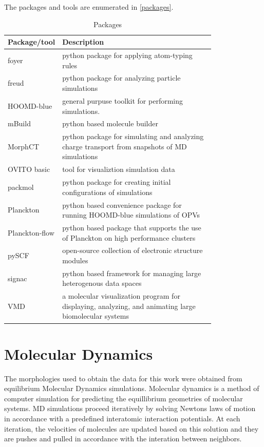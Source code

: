 The packages and tools are enumerated in \autoref{packages}.
\begin{table}[ht]
    \caption{Packages} %
\centering %
\begin{tabular}{|l|p{0.8\linewidth}|} %
\hline\hline %
Package/tool & Description \\ [0.5ex] %
\hline %
    foyer & python package for applying atom-typing rules  \cite{Klein2018a}\\ [1ex] %
freud & python package for analyzing particle simulations  \cite{Ramasubramani2020}\\ [1ex] %
HOOMD-blue & general purpuse toolkit for performing simulations.   \cite{Anderson2020a}\\ [1ex] %
    mBuild & python based molecule builder \cite{Klein2018a}\\ [1ex] %
MorphCT & python package for simulating and analyzing charge transport from 
    snapshots of MD simulations \cite{jones2017}\cite{cmelab}\\[1ex] 
OVITO basic & tool for visualiztion simulation data \cite{Stukowski2010a}\\[1ex] 
packmol & python package for creating initial configurations of simulations \cite{Martinez2009}\\[1ex] 
Planckton & python based convenience package for running HOOMD-blue
    simulations of OPVs \cite{cmelab}\\[1ex]
Planckton-flow & python based package that supports the use of Planckton on
    high performance clusters\cite{cmelab}\\[1ex]
pySCF & open-source collection of electronic structure modules \cite{Sun2018a}\\[1ex]
signac & python based framework for managing large heterogenous data spaces \cite{Adorf2016}\\[1ex]
VMD & a molecular visualization program for displaying, analyzing, and animating large biomolecular
    systems \cite{Humphrey1996}\\

\hline %
\end{tabular}
\label{packages} %
\end{table}


\section{Molecular Dynamics}
\label{md}
The morphologies used to
obtain the data for this work were obtained from equilibrium Molecular Dynamics simulations. 
Molecular dynamics is a method of computer simulation for predicting the equillibrium geometries of molecular
systems. MD simulations proceed iteratively by solving Newtons laws of motion
in accordance with a predefined interatomic interaction potentials.
At each iteration, the velocities of molecules are
updated based on this solution and they are pushes and pulled in accordance with
the interation between neighbors.

